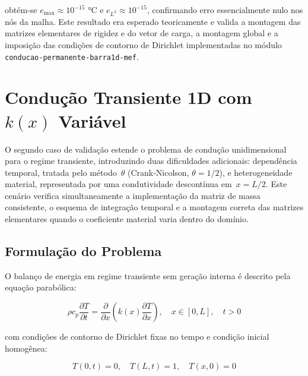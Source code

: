 \noindent obtém-se $e_{\max} \approx 10^{-15}$ °C e $e_{L^2} \approx 10^{-15}$, confirmando erro essencialmente nulo nos nós da malha. Este resultado era esperado teoricamente e valida a montagem das matrizes elementares de rigidez e do vetor de carga, a montagem global e a imposição das condições de contorno de Dirichlet implementadas no módulo \texttt{conducao-permanente-barra1d-mef}.


\section{Condução Transiente 1D com $k(x)$ Variável}
\label{sec:val_calor_transiente}

O segundo caso de validação estende o problema de condução unidimensional para o regime transiente, introduzindo duas dificuldades adicionais: dependência temporal, tratada pelo método~$\theta$ (Crank-Nicolson, $\theta = 1/2$), e heterogeneidade material, representada por uma condutividade descontínua em~$x = L/2$. Este cenário verifica simultaneamente a implementação da matriz de massa consistente, o esquema de integração temporal e a montagem correta das matrizes elementares quando o coeficiente material varia dentro do domínio.

\subsection{Formulação do Problema}

O balanço de energia em regime transiente sem geração interna é descrito pela equação parabólica:

\begin{equation}
    \rho c_p \frac{\partial T}{\partial t} = \frac{\partial}{\partial x}\!\left( k(x) \frac{\partial T}{\partial x} \right), \quad x \in [0, L], \quad t > 0
    \label{eq:val_calor_transiente_edp}
\end{equation}

\noindent com condições de contorno de Dirichlet fixas no tempo e condição inicial homogênea:

\begin{equation}
    T(0, t) = 0, \quad T(L, t) = 1, \quad T(x, 0) = 0
    \label{eq:val_calor_transiente_cc}
\end{equation}

